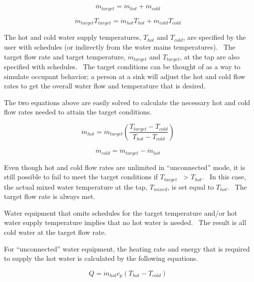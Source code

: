 \begin{equation}
{\dot m_{target}} = {\dot m_{hot}} + {\dot m_{cold}}
\end{equation}

\begin{equation}
{\dot m_{target}}{T_{target}} = {\dot m_{hot}}{T_{hot}} + {\dot m_{cold}}{T_{cold}}
\end{equation}

The hot and cold water supply temperatures, \({T_{hot}}\) and \({T_{cold}}\), are specified by the user with schedules (or indirectly from the water mains temperatures).~ The target flow rate and target temperature, \({\dot m_{target}}\) and \({T_{target}}\), at the tap are also specified with schedules.~ The target conditions can be thought of as a way to simulate occupant behavior; a person at a sink will adjust the hot and cold flow rates to get the overall water flow and temperature that is desired.

The two equations above are easily solved to calculate the necessary hot and cold flow rates needed to attain the target conditions.

\begin{equation}
{\dot m_{hot}} = {\dot m_{target}}\left( {\frac{{{T_{target}} - {T_{cold}}}}{{{T_{hot}} - {T_{cold}}}}} \right)
\end{equation}

\begin{equation}
{\dot m_{cold}} = {\dot m_{target}} - {\dot m_{hot}}
\end{equation}

Even though hot and cold flow rates are unlimited in ``unconnected'' mode, it is still possible to fail to meet the target conditions if \({T_{target}}\) ~\textgreater{} \({T_{hot}}\).~ In this case, the actual mixed water temperature at the tap, \({T_{mixed}}\), is set equal to \({T_{hot}}\).~ The target flow rate is always met.

Water equipment that omits schedules for the target temperature and/or hot water supply temperature implies that no hot water is needed.~ The result is all cold water at the target flow rate.

For ``unconnected'' water equipment, the heating rate and energy that is required to supply the hot water is calculated by the following equations.

\begin{equation}
Q = {\dot m_{hot}}{c_p}\left( {{T_{hot}} - {T_{cold}}} \right)
\end{equation}

